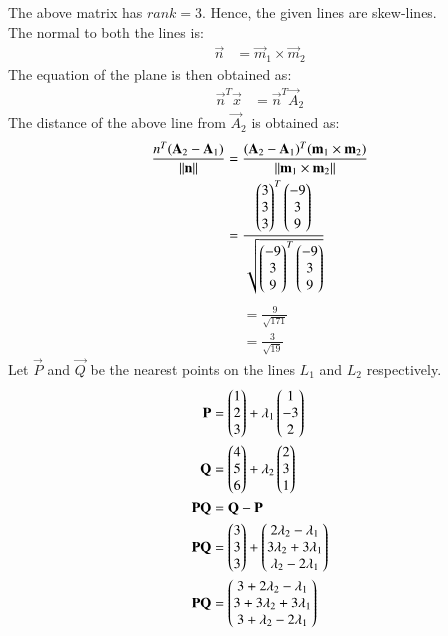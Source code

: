 \documentclass[journal,12pt,twocolumn]{IEEEtran}
\begin{document}
The above matrix has $rank = 3$. Hence, the given lines are skew-lines.\\
The normal to both the lines is:
\begin{align}
    \vec{n} &= \vec{m}_1 \times \vec{m}_2
\end{align}
The equation of the plane is then obtained as:
\begin{align}
    \vec{n}^T\vec{x} &= \vec{n}^T\vec{A}_2
\end{align}
The distance of the above line from $\vec{A}_2$ is obtained as:
\begin{align}
    \frac{n^T(\mathbf{A}_2 - \mathbf{A}_1)}{\lVert\mathbf{n}\rVert} &= \frac{(\mathbf{A}_2 - \mathbf{A}_1)^T(\mathbf{m}_1 \times \mathbf{m}_2)}{\lVert\mathbf{m}_1 \times \mathbf{m}_2\rVert}\\
    &= \frac{\begin{pmatrix}3\\3\\3\end{pmatrix}^T\begin{pmatrix}-9\\3\\9\end{pmatrix}}{\sqrt{\begin{pmatrix}-9\\3\\9\end{pmatrix}^T\begin{pmatrix}-9\\3\\9\end{pmatrix}}}
\end{align}
\begin{align}
    &= \frac{9}{\sqrt{171}}\\
    &= \frac{3}{\sqrt{19}}
\end{align}
Let $\vec{P}$ and $\vec{Q}$ be the nearest points on the lines $L_1$ and $L_2$ respectively.
\begin{align}
    \mathbf{P} &= \begin{pmatrix}1\\2\\3\end{pmatrix} + \lambda_1 \begin{pmatrix}1\\-3\\2\end{pmatrix}\\
    \mathbf{Q} &= \begin{pmatrix}4\\5\\6\end{pmatrix} + \lambda_2 \begin{pmatrix}2\\3\\1\end{pmatrix}\\
    \mathbf{PQ} &= \mathbf{Q} - \mathbf{P}\\
    \mathbf{PQ} &= \begin{pmatrix}3\\3\\3\end{pmatrix} + \begin{pmatrix} 2\lambda_2-\lambda_1\\ 3\lambda_2 + 3\lambda_1\\ \lambda_2 - 2\lambda_1\end{pmatrix}\\
    \mathbf{PQ} &= \begin{pmatrix}3 + 2\lambda_2- \lambda_1 \\ 3+3\lambda_2 +3\lambda_1 \\ 3 + \lambda_2 - 2\lambda_1\end{pmatrix}
\end{align}
\end{document}
